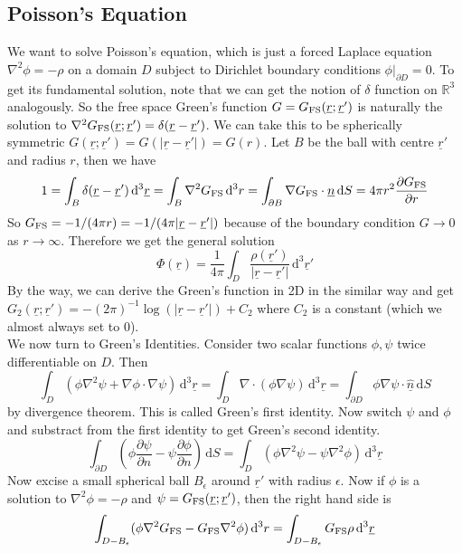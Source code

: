 \subsection{Poisson's Equation}
We want to solve Poisson's equation, which is just a forced Laplace equation $\nabla^2\phi=-\rho$ on a domain $D$ subject to Dirichlet boundary conditions $\phi|_{\partial D}=0$.
To get its fundamental solution, note that we can get the notion of $\delta$ function on $\mathbb R^3$ analogously.
So the free space Green's function $G=G_{\rm FS}(\underline{r};\underline{r}')$ is naturally the solution to $\nabla^2G_{\rm FS}(\underline{r};\underline{r}')=\delta(\underline{r}-\underline{r}')$.
We can take this to be spherically symmetric $G(\underline{r};\underline{r}')=G(|\underline{r}-\underline{r}'|)=G(r)$.
Let $B$ be the ball with centre $\underline{r}'$ and radius $r$, then we have
$$1=\int_B\delta(\underline{r}-\underline{r}')\,\mathrm d^3\underline{r}=\int_B\nabla^2G_{\rm FS}\,\mathrm d^3r=\int_{\partial B}\nabla G_{\rm FS}\cdot\underline{n}\,\mathrm dS=4\pi r^2\frac{\partial G_{\rm FS}}{\partial r}$$
So $G_{\rm FS}=-1/(4\pi r)=-1/(4\pi|\underline{r}-\underline{r}'|)$ because of the boundary condition $G\to 0$ as $r\to\infty$.
Therefore we get the general solution
$$\Phi(\underline{r})=\frac{1}{4\pi}\int_D\frac{\rho(\underline{r}')}{|\underline{r}-\underline{r}'|}\,\mathrm d^3\underline{r}'$$
By the way, we can derive the Green's function in 2D in the similar way and get $G_2(\underline{r};\underline{r}')=-(2\pi)^{-1}\log(|\underline{r}-\underline{r}'|)+C_2$ where $C_2$ is a constant (which we almost always set to $0$).\\
We now turn to Green's Identities.
Consider two scalar functions $\phi,\psi$ twice differentiable on $D$.
Then
$$\int_D(\phi\nabla^2\psi+\nabla\phi\cdot\nabla\psi)\,\mathrm d^3\underline{r}=\int_D\nabla\cdot(\phi\nabla\psi)\,\mathrm d^3\underline{r}=\int_{\partial D}\phi\nabla\psi\cdot\underline{\hat{n}}\,\mathrm dS$$
by divergence theorem.
This is called Green's first identity.
Now switch $\psi$ and $\phi$ and substract from the first identity to get Green's second identity.
$$\int_{\partial D}\left( \phi\frac{\partial\psi}{\partial n}-\psi\frac{\partial\phi}{\partial n} \right)\,\mathrm dS=\int_D(\phi\nabla^2\psi-\psi\nabla^2\phi)\,\mathrm d^3\underline{r}$$
Now excise a small spherical ball $B_\epsilon$ around $\underline{r}'$ with radius $\epsilon$.
Now if $\phi$ is a solution to $\nabla^2\phi=-\rho$ and $\psi=G_{\rm FS}(\underline{r};\underline{r}')$, then the right hand side is
$$\int_{D-B_\epsilon}(\phi\nabla^2G_{\rm FS}-G_{\rm FS}\nabla^2\phi)\,\mathrm d^3r=\int_{D-B_\epsilon}G_{\rm FS}\rho\,\mathrm d^3\underline{r}$$
